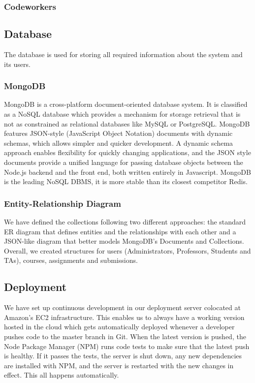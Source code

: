 \subsubsection{Codeworkers}

\subsection{Database}

The database is used for storing all required information about the system and
its users.

\subsubsection{MongoDB}

MongoDB is a cross-platform document-oriented database system. It is classified
as a NoSQL database which provides a mechanism for storage retrieval that is not
as constrained as relational databases like MySQL or PostgreSQL. MongoDB
features JSON-style (JavaScript Object Notation) documents with dynamic schemas,
which allows simpler and quicker development. A dynamic schema approach enables
flexibility for quickly changing applications, and the JSON style documents
provide a unified language for passing database objects between the Node.js
backend and the front end, both written entirely in Javascript. MongoDB is the
leading NoSQL DBMS, it is more stable than its closest competitor Redis. 

\subsubsection{Entity-Relationship Diagram}

We have defined the collections following two different approaches: the
standard ER diagram that defines entities and the relationships with each other
and a JSON-like diagram that better models MongoDB's Documents and Collections.
Overall, we created structures for users (Administrators, Professors, Students
and TAs), courses, assignments and submissions.


\subsection{Deployment}

We have set up continuous development in our deployment server colocated at
Amazon's EC2 infrastructure. This enables us to always have a working version
hosted in the cloud which gets automatically deployed whenever a developer
pushes code to the master branch in Git. When the latest version is pushed, the
Node Package Manager (NPM) runs code tests to make sure that the latest push is
healthy. If it passes the tests, the server is shut down, any new dependencies
are installed with NPM, and the server is restarted with the new changes in
effect. This all happens automatically.

